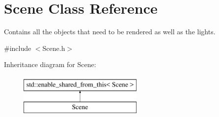 \hypertarget{class_scene}{}\section{Scene Class Reference}
\label{class_scene}


Contains all the objects that need to be rendered as well as the lights.




{\ttfamily \#include $<$Scene.\+h$>$}

Inheritance diagram for Scene\+:\begin{figure}[H]
\begin{center}
\leavevmode
\includegraphics[height=2.000000cm]{class_scene}
\end{center}
\end{figure}
